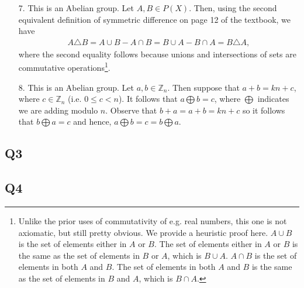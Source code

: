 \documentclass[12pt]{article}
\def\Z{{\mathbb Z}}        %
\numberwithin{theorem}{section}
\numberwithin{equation}{section}
\numberwithin{remark}{section}
\numberwithin{definition}{section}
\numberwithin{theorem}{section}
\numberwithin{lemma}{section}
\numberwithin{example}{section}
\begin{document}
\begin{itemize}
{\begin{itemize}
{				\begin{align*}
					(f+g)(x)=f(x)+g(x)=g(x)+f(x)=(g+f)(x),
				\end{align*}
			where the second equality follows because addition of real numbers is commutative.}
			\item[7.]{This is an Abelian group. Let $A,B\in P(X)$. Then, using the second equivalent definition of symmetric difference on page 12 of the textbook, we have
				\begin{align*}
					A\triangle B = A\cup B - A \cap B = B\cup A - B\cap A = B\triangle A,
				\end{align*}
			where the second equality follows because unions and intersections of sets are commutative operations\footnote{Unlike the prior uses of commutativity of e.g. real numbers, this one is not axiomatic, but still pretty obvious. We provide a heuristic proof here. $A\cup B$ is the set of elements either in $A$ or $B$. The set of elements either in $A$ or $B$ is the same as the set of elements in $B$ or $A$, which is $B\cup A$. $A\cap B$ is the set of elements in both $A$ and $B$. The set of elements in both $A$ and $B$ is the same as the set of elements in $B$ and $A$, which is $B\cap A$.}.}
			\item[8.]{This is an Abelian group. Let $a,b\in\Z_n$. Then suppose that $a+b=kn+c$, where $c\in\Z_n$ (i.e. $0\le c < n$). It follows that $a\bigoplus b = c$, where $\bigoplus$ indicates we are adding modulo $n$. Observe that $b+a=a+b=kn+c$ so it follows that $b\bigoplus a = c$ and hence, $a\bigoplus b=c=b\bigoplus a$.}
		\end{itemize}}
\end{itemize}



\subsection{Q3}

\subsection{Q4}
\end{document}
